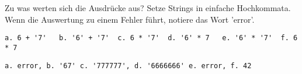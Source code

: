 \question[3]
Zu was werten sich die Ausdrücke aus? Setze Strings in einfache Hochkommata.
Wenn die Auswertung zu einem Fehler führt, notiere das
Wort 'error'.

\begin{lstlisting}
a. 6 + '7'   b. '6' + '7'  c. 6 * '7'  d. '6' * 7   e. '6' * '7'  f. 6 * 7
\end{lstlisting}
\begin{solutionbox}{2cm}
\begin{lstlisting}
a. error, b. '67' c. '777777', d. '6666666' e. error, f. 42
\end{lstlisting}
\end{solutionbox}
